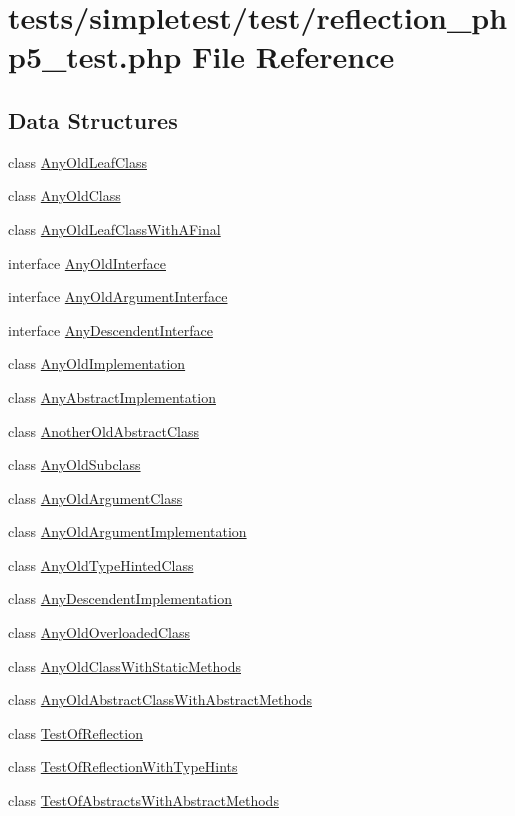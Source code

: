 \hypertarget{reflection__php5__test_8php}{\section{tests/simpletest/test/reflection\-\_\-php5\-\_\-test.php File Reference}
\label{reflection__php5__test_8php}
}
\subsection*{Data Structures}
\begin{DoxyCompactItemize}
\item 
class \hyperlink{class_any_old_leaf_class}{Any\-Old\-Leaf\-Class}
\item 
class \hyperlink{class_any_old_class}{Any\-Old\-Class}
\item 
class \hyperlink{class_any_old_leaf_class_with_a_final}{Any\-Old\-Leaf\-Class\-With\-A\-Final}
\item 
interface \hyperlink{interface_any_old_interface}{Any\-Old\-Interface}
\item 
interface \hyperlink{interface_any_old_argument_interface}{Any\-Old\-Argument\-Interface}
\item 
interface \hyperlink{interface_any_descendent_interface}{Any\-Descendent\-Interface}
\item 
class \hyperlink{class_any_old_implementation}{Any\-Old\-Implementation}
\item 
class \hyperlink{class_any_abstract_implementation}{Any\-Abstract\-Implementation}
\item 
class \hyperlink{class_another_old_abstract_class}{Another\-Old\-Abstract\-Class}
\item 
class \hyperlink{class_any_old_subclass}{Any\-Old\-Subclass}
\item 
class \hyperlink{class_any_old_argument_class}{Any\-Old\-Argument\-Class}
\item 
class \hyperlink{class_any_old_argument_implementation}{Any\-Old\-Argument\-Implementation}
\item 
class \hyperlink{class_any_old_type_hinted_class}{Any\-Old\-Type\-Hinted\-Class}
\item 
class \hyperlink{class_any_descendent_implementation}{Any\-Descendent\-Implementation}
\item 
class \hyperlink{class_any_old_overloaded_class}{Any\-Old\-Overloaded\-Class}
\item 
class \hyperlink{class_any_old_class_with_static_methods}{Any\-Old\-Class\-With\-Static\-Methods}
\item 
class \hyperlink{class_any_old_abstract_class_with_abstract_methods}{Any\-Old\-Abstract\-Class\-With\-Abstract\-Methods}
\item 
class \hyperlink{class_test_of_reflection}{Test\-Of\-Reflection}
\item 
class \hyperlink{class_test_of_reflection_with_type_hints}{Test\-Of\-Reflection\-With\-Type\-Hints}
\item 
class \hyperlink{class_test_of_abstracts_with_abstract_methods}{Test\-Of\-Abstracts\-With\-Abstract\-Methods}
\end{DoxyCompactItemize}
